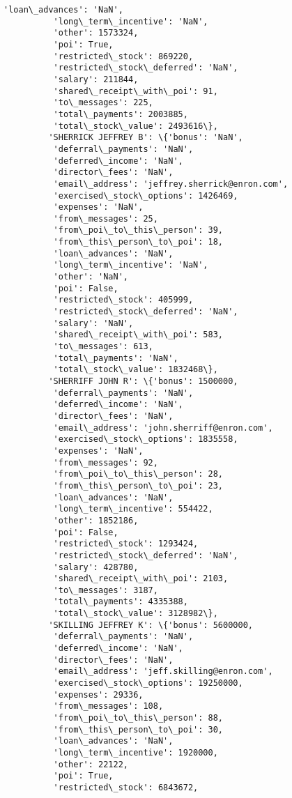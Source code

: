 \documentclass[11pt]{article}
\begin{document}
\begin{Verbatim}[commandchars=\\\{\}]
          'loan\_advances': 'NaN',
          'long\_term\_incentive': 'NaN',
          'other': 1573324,
          'poi': True,
          'restricted\_stock': 869220,
          'restricted\_stock\_deferred': 'NaN',
          'salary': 211844,
          'shared\_receipt\_with\_poi': 91,
          'to\_messages': 225,
          'total\_payments': 2003885,
          'total\_stock\_value': 2493616\},
         'SHERRICK JEFFREY B': \{'bonus': 'NaN',
          'deferral\_payments': 'NaN',
          'deferred\_income': 'NaN',
          'director\_fees': 'NaN',
          'email\_address': 'jeffrey.sherrick@enron.com',
          'exercised\_stock\_options': 1426469,
          'expenses': 'NaN',
          'from\_messages': 25,
          'from\_poi\_to\_this\_person': 39,
          'from\_this\_person\_to\_poi': 18,
          'loan\_advances': 'NaN',
          'long\_term\_incentive': 'NaN',
          'other': 'NaN',
          'poi': False,
          'restricted\_stock': 405999,
          'restricted\_stock\_deferred': 'NaN',
          'salary': 'NaN',
          'shared\_receipt\_with\_poi': 583,
          'to\_messages': 613,
          'total\_payments': 'NaN',
          'total\_stock\_value': 1832468\},
         'SHERRIFF JOHN R': \{'bonus': 1500000,
          'deferral\_payments': 'NaN',
          'deferred\_income': 'NaN',
          'director\_fees': 'NaN',
          'email\_address': 'john.sherriff@enron.com',
          'exercised\_stock\_options': 1835558,
          'expenses': 'NaN',
          'from\_messages': 92,
          'from\_poi\_to\_this\_person': 28,
          'from\_this\_person\_to\_poi': 23,
          'loan\_advances': 'NaN',
          'long\_term\_incentive': 554422,
          'other': 1852186,
          'poi': False,
          'restricted\_stock': 1293424,
          'restricted\_stock\_deferred': 'NaN',
          'salary': 428780,
          'shared\_receipt\_with\_poi': 2103,
          'to\_messages': 3187,
          'total\_payments': 4335388,
          'total\_stock\_value': 3128982\},
         'SKILLING JEFFREY K': \{'bonus': 5600000,
          'deferral\_payments': 'NaN',
          'deferred\_income': 'NaN',
          'director\_fees': 'NaN',
          'email\_address': 'jeff.skilling@enron.com',
          'exercised\_stock\_options': 19250000,
          'expenses': 29336,
          'from\_messages': 108,
          'from\_poi\_to\_this\_person': 88,
          'from\_this\_person\_to\_poi': 30,
          'loan\_advances': 'NaN',
          'long\_term\_incentive': 1920000,
          'other': 22122,
          'poi': True,
          'restricted\_stock': 6843672,

\end{Verbatim}
\end{document}

